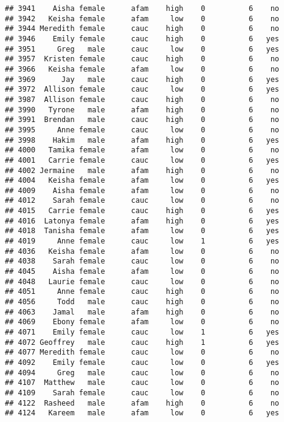 \documentclass[
]{article}
\begin{document}
\begin{verbatim}
## 3941    Aisha female      afam    high    0          6    no
## 3942   Keisha female      afam     low    0          6    no
## 3944 Meredith female      cauc    high    0          6    no
## 3946    Emily female      cauc    high    0          6   yes
## 3951     Greg   male      cauc     low    0          6   yes
## 3957  Kristen female      cauc    high    0          6    no
## 3966   Keisha female      afam     low    0          6    no
## 3969      Jay   male      cauc    high    0          6   yes
## 3972  Allison female      cauc     low    0          6   yes
## 3987  Allison female      cauc    high    0          6    no
## 3990   Tyrone   male      afam    high    0          6    no
## 3991  Brendan   male      cauc    high    0          6    no
## 3995     Anne female      cauc     low    0          6    no
## 3998    Hakim   male      afam    high    0          6   yes
## 4000   Tamika female      afam     low    0          6    no
## 4001   Carrie female      cauc     low    0          6   yes
## 4002 Jermaine   male      afam    high    0          6    no
## 4004   Keisha female      afam     low    0          6   yes
## 4009    Aisha female      afam     low    0          6    no
## 4012    Sarah female      cauc     low    0          6    no
## 4015   Carrie female      cauc    high    0          6   yes
## 4016  Latonya female      afam    high    0          6   yes
## 4018  Tanisha female      afam     low    0          6   yes
## 4019     Anne female      cauc     low    1          6   yes
## 4036   Keisha female      afam     low    0          6    no
## 4038    Sarah female      cauc     low    0          6    no
## 4045    Aisha female      afam     low    0          6    no
## 4048   Laurie female      cauc     low    0          6    no
## 4051     Anne female      cauc    high    0          6    no
## 4056     Todd   male      cauc    high    0          6    no
## 4063    Jamal   male      afam    high    0          6    no
## 4069    Ebony female      afam     low    0          6    no
## 4071    Emily female      cauc     low    1          6   yes
## 4072 Geoffrey   male      cauc    high    1          6   yes
## 4077 Meredith female      cauc     low    0          6    no
## 4092    Emily female      cauc     low    0          6   yes
## 4094     Greg   male      cauc     low    0          6    no
## 4107  Matthew   male      cauc     low    0          6    no
## 4109    Sarah female      cauc     low    0          6    no
## 4122  Rasheed   male      afam    high    0          6    no
## 4124   Kareem   male      afam     low    0          6   yes

\end{verbatim}
\end{document}
